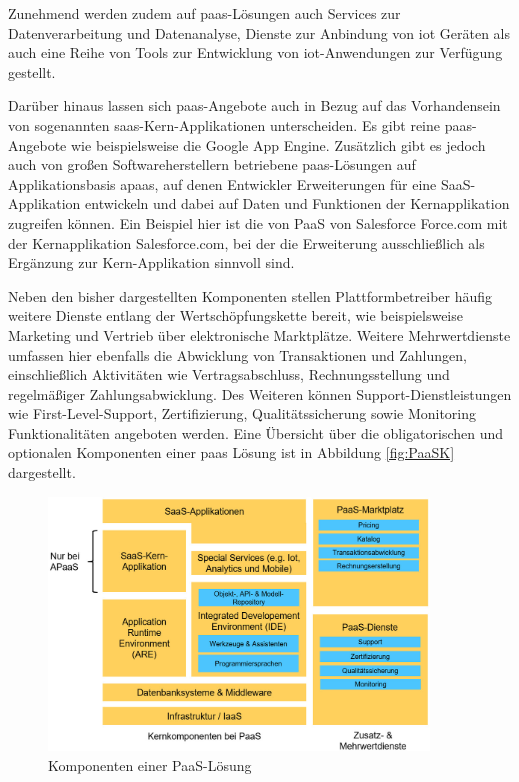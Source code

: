 Zunehmend werden zudem auf \ac{paas}-Lösungen auch Services zur Datenverarbeitung und Datenanalyse, Dienste zur Anbindung von \ac{iot} Geräten als auch eine Reihe von Tools zur Entwicklung von \ac{iot}-Anwendungen zur Verfügung gestellt. \autocite[Vgl.][]{IBM2023}

Darüber hinaus lassen sich \ac{paas}-Angebote auch in Bezug auf das Vorhandensein von sogenannten \ac{saas}-Kern-Applikationen unterscheiden. Es gibt reine \ac{paas}-Angebote wie beispielsweise die Google App Engine. Zusätzlich gibt es jedoch auch von großen Softwareherstellern betriebene \ac{paas}-Lösungen auf Applikationsbasis \acs{apaas}, auf denen Entwickler Erweiterungen für eine SaaS-Applikation entwickeln und dabei auf Daten und Funktionen der Kernapplikation zugreifen können. Ein Beispiel hier ist die von PaaS von Salesforce Force.com mit der Kernapplikation Salesforce.com, bei der die Erweiterung ausschließlich als Ergänzung zur Kern-Applikation sinnvoll sind. \autocite[Vgl.][S. 371]{BEIMBORN2011} 

Neben den bisher dargestellten Komponenten stellen Plattformbetreiber häufig weitere Dienste entlang der Wertschöpfungskette bereit, wie beispielsweise Marketing und Vertrieb über elektronische Marktplätze. Weitere Mehrwertdienste umfassen hier ebenfalls die Abwicklung von Transaktionen und Zahlungen, einschließlich Aktivitäten wie Vertragsabschluss, Rechnungsstellung und regelmäßiger Zahlungsabwicklung. Des Weiteren können Support-Dienstleistungen wie First-Level-Support, Zertifizierung, Qualitätssicherung sowie Monitoring Funktionalitäten angeboten werden. \autocite[Vgl.][S. 598]{HAHN2016} Eine Übersicht über die obligatorischen und optionalen Komponenten einer \ac{paas} Lösung ist in Abbildung \vref{fig:PaaSK} dargestellt.


\begin{figure}[h]
    \centering
    \includegraphics[width=0.9\textwidth]{img/PaaS_Komponenten.jpg}
    \caption[Komponenten einer PaaS-Lösung]{Komponenten einer PaaS-Lösung\autocite{PaaSK}}
    \label{fig:PaaSK}
\end{figure}

